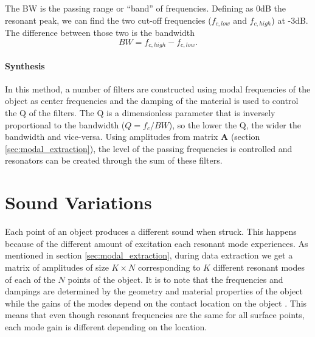 The \gls{BW} is the passing range or ``band'' of frequencies. Defining as 0dB the resonant peak, we can find the two cut-off frequencies ($f_{c,low}$ and $f_{c,high}$) at -3dB. The difference between those two is the bandwidth  
\begin{equation}\label{eq:bw}
BW = f_{c,high}-f_{c,low}.
\end{equation} \cite{bib:bpf}  

\paragraph{Synthesis}\label{par:synth}
\hfill \break

In this method, a number of filters are constructed using modal frequencies of the object as center frequencies and the damping of the material is used to control the \gls{Q} of the filters.  The \gls{Q} is a dimensionless parameter that is inversely proportional to the bandwidth ($Q=f_c/BW$), so the lower the \gls{Q}, the wider the bandwidth and vice-versa. Using amplitudes from matrix \textbf{A} (section \ref{sec:modal_extraction}), the level of the passing frequencies is controlled and resonators can be created through the sum of these filters. 

\section{Sound Variations} \label{sec:sound_variation}
Each point of an object produces a different sound when struck. This happens because of the different amount of excitation each resonant mode experiences. As mentioned in section \ref{sec:modal_extraction}, during data extraction we get a matrix of amplitudes of size $K\times N$ corresponding to $K$ different resonant modes of each of the $N$ points of the object. It is to note that the frequencies and dampings are determined by the geometry and material properties of the object while the gains of the modes depend on the contact location on the
object \cite{van2001foleyautomatic}. This means that even though resonant frequencies are the same for all surface points, each mode gain is different depending on the location.

